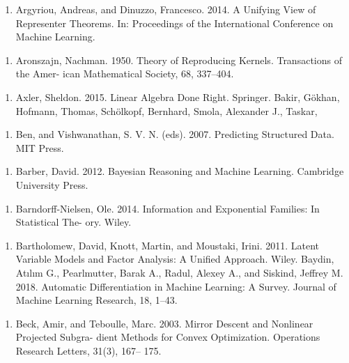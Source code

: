 \begin{enumerate}
\item Argyriou, Andreas, and Dinuzzo, Francesco. 2014. A Unifying View of Representer Theorems. In: Proceedings of the International Conference on Machine Learning.
\end{enumerate}

\begin{enumerate}
\item Aronszajn, Nachman. 1950. Theory of Reproducing Kernels. Transactions of the Amer- ican Mathematical Society, 68, 337–404.
\end{enumerate}

\begin{enumerate}
\item Axler, Sheldon. 2015. Linear Algebra Done Right. Springer. Bakir, Gökhan, Hofmann, Thomas, Schölkopf, Bernhard, Smola, Alexander J., Taskar,
\end{enumerate}

\begin{enumerate}
\item Ben, and Vishwanathan, S. V. N. (eds). 2007. Predicting Structured Data. MIT Press.
\end{enumerate}

\begin{enumerate}
\item Barber, David. 2012. Bayesian Reasoning and Machine Learning. Cambridge University Press.
\end{enumerate}

\begin{enumerate}
\item Barndorff-Nielsen, Ole. 2014. Information and Exponential Families: In Statistical The- ory. Wiley.
\end{enumerate}

\begin{enumerate}
\item Bartholomew, David, Knott, Martin, and Moustaki, Irini. 2011. Latent Variable Models and Factor Analysis: A Uniﬁed Approach. Wiley. Baydin, Atılım G., Pearlmutter, Barak A., Radul, Alexey A., and Siskind, Jeffrey M. 2018. Automatic Differentiation in Machine Learning: A Survey. Journal of Machine Learning Research, 18, 1–43.
\end{enumerate}

\begin{enumerate}
\item Beck, Amir, and Teboulle, Marc. 2003. Mirror Descent and Nonlinear Projected Subgra- dient Methods for Convex Optimization. Operations Research Letters, 31(3), 167– 175.
\end{enumerate}

